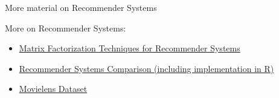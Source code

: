 \begin{vbframe}{More material on Recommender Systems}

More on Recommender Systems:
\begin{itemize}
\item \href{https://endymecy.gitbooks.io/spark-ml-source-analysis/content/\%E6\%8E\%A8\%E8\%8D\%90/papers/Matrix\%20Factorization\%20Techniques\%20for\%20Recommender\%20Systems.pdf}{Matrix Factorization Techniques for Recommender Systems}
\item \href{https://rpubs.com/tarashnot/recommender_comparison}{Recommender Systems Comparison (including implementation in R)}
\item \href{https://grouplens.org/datasets/movielens/100k/}{Movielens Dataset}
\end{itemize}

\end{vbframe}



\endlecture








